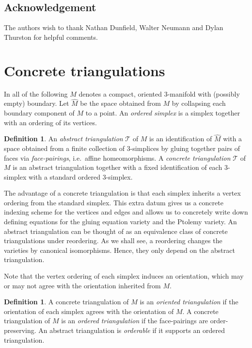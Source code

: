 \documentclass[12pt]{amsart}
\theoremstyle{definition}
\newtheorem{definition}[theorem]{Definition}
\numberwithin{equation}{section}
\begin{document}
\subsection{Acknowledgement} The authors wish to thank Nathan Dunfield, Walter Neumann and Dylan Thurston for helpful comments.

\section{Concrete triangulations}\label{sec:TriangulationSection}


In all of the following $M$ denotes a compact, oriented $3$-manifold with (possibly empty) boundary. Let $\widehat M$ be the space obtained from $M$ by collapsing each boundary component of $M$ to a point. An \emph{ordered simplex} is a simplex together with an ordering of its vertices.

\begin{definition}
An \emph{abstract triangulation} $\mathcal{T}$ of $M$ is an identification of $\widehat{M}$ with a space obtained from a finite collection of $3$-simplices by gluing together pairs of faces via \emph{face-pairings}, i.e.~affine homeomorphisms. A \emph{concrete triangulation} $\mathcal{T}$ of $M$ is an abstract triangulation together with a fixed identification of each $3$-simplex with a standard ordered $3$-simplex.
\end{definition}

The advantage of a concrete triangulation is that each simplex inherits a vertex ordering from the standard simplex. This extra datum gives us a concrete indexing scheme for the vertices and edges and allows us to concretely write down defining equations for the gluing equation variety and the Ptolemy variety. An abstract triangulation can be thought of as an equivalence class of concrete triangulations under reordering. As we shall see, a reordering changes the varieties by canonical isomorphisms. Hence, they only depend on the abstract triangulation.

Note that the vertex ordering of each simplex induces an orientation, which may or may not agree with the orientation inherited from $M$.

\begin{definition}
A concrete triangulation of $M$ is an \emph{oriented triangulation} if the orientation of each simplex agrees with the orientation of $M$. A concrete triangulation of $M$ is an \emph{ordered triangulation} if the face-pairings are order-preserving. An abstract triangulation is {\it orderable} if it supports an ordered triangulation.
\end{definition}
\end{document}
